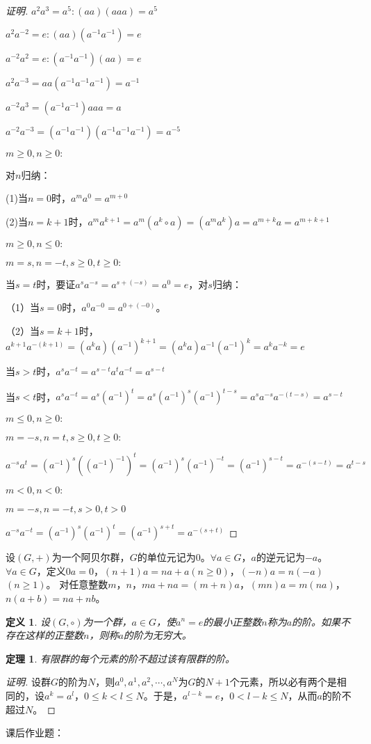\documentclass{article}
\newtheorem{Def}{定义}
\newtheorem{Thm}{定理}
\begin{document}
\begin{CJK*}{UTF8}{gbsn}
\begin{proof}[证明]
$a^2a^3=a^5:(aa)(aaa)=a^5$

$a^2a^{-2}=e:(aa)(a^{-1}a^{-1})=e$

$a^{-2}a^{2}=e:(a^{-1}a^{-1})(aa)=e$

$a^2a^{-3}=aa(a^{-1}a^{-1}a^{-1})=a^{-1}$

$a^{-2}a^3=(a^{-1}a^{-1})aaa=a$



$a^{-2}a^{-3}=(a^{-1}a^{-1})(a^{-1}a^{-1}a^{-1})=a^{-5}$

$m\geq 0,n\geq 0:$

对$n$归纳：

(1)当$n=0$时，$a^ma^0=a^{m+0}$

(2)当$n=k+1$时，$a^{m}a^{k+1}=a^m(a^k\circ a)=(a^ma^k)a=a^{m+k}a=a^{m+k+1}$

$m\geq 0,n \leq 0:$


$m=s,n=-t, s\geq 0,t\geq 0:$

当$s=t$时，要证$a^{s}a^{-s}=a^{s+(-s)}=a^0=e$，对$s$归纳：

（1）当$s=0$时，$a^0a^{-0}=a^{0+(-0)}$。

（2）当$s=k+1$时，$a^{k+1}a^{-(k+1)}=(a^ka)(a^{-1})^{k+1}=(a^ka)a^{-1}(a^{-1})^k=a^ka^{-k}=e$

当$s>t$时，$a^sa^{-t}=a^{s-t}a^{t}a^{-t}=a^{s-t}$

当$s<t$时，$a^sa^{-t}=a^s(a^{-1})^t=a^s(a^{-1})^s(a^{-1})^{t-s}=a^sa^{-s}a^{-(t-s)}=a^{s-t}$

$m\leq 0, n\geq 0:$

$m=-s,n=t,s\geq 0, t\geq 0:$

$a^{-s}a^t=(a^{-1})^s((a^{-1})^{-1})^t=(a^{-1})^s(a^{-1})^{-t}=(a^{-1})^{s-t}=a^{-(s-t)}=a^{t-s}$

$m<0, n<0:$

$m=-s,n=-t, s>0,t>0$

$a^{-s}a^{-t}=(a^{-1})^s(a^{-1})^t=(a^{-1})^{s+t}=a^{-(s+t)}$
\end{proof}
设$(G,+)$为一个阿贝尔群，$G$的单位元记为$0$。$\forall a\in G$，$a$的逆元记为$-a$。$\forall a\in G$，定义$0a=0$，$(n+1)a=na+a$$(n\geq 0)$，$(-n)a=n(-a)$$(n\geq 1)$。
对任意整数$m$，$n$，$ma+na=(m+n)a$，$(mn)a=m(na)$，$n(a+b)=na+nb$。
\begin{Def}
  设$(G,\circ)$为一个群，$a\in G$，使$a^n=e$的最小正整数$n$称为$a$的阶。如果不存在这样的正整数$n$，则称$a$的阶为无穷大。
\end{Def}
\begin{Thm}
  有限群的每个元素的阶不超过该有限群的阶。
\end{Thm}
\begin{proof}[证明]
  设群$G$的阶为$N$，则$a^0,a^1,a^2,\cdots,a^N$为$G$的$N+1$个元素，所以必有两个是相同的，设$a^k=a^l$，$0\leq k<l\leq N$。于是，$a^{l-k}=e$，$0<l-k\leq N$，从而$a$的阶不超过$N$。
\end{proof}
课后作业题：


\end{CJK*}
\end{document}
